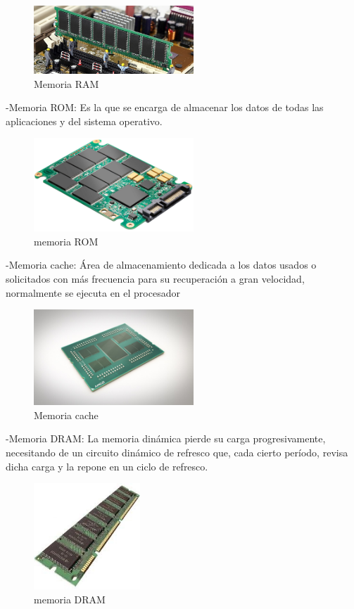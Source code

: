 \documentclass{article}
\begin{document}
\begin{figure}[h]
\includegraphics[width=6cm]{Memoria.jpg}
\centering
\caption{Memoria RAM}
\end{figure}

-Memoria ROM: Es la que se encarga de almacenar los datos de todas las aplicaciones y del sistema operativo.\newline

\begin{figure}[h]
\includegraphics[width=6cm]{ssd.jpg}
\centering
\caption{memoria ROM}
\end{figure}

-Memoria cache: Área de almacenamiento dedicada a los datos usados o solicitados con más frecuencia para su recuperación a gran velocidad, normalmente se ejecuta en el procesador \newline
\begin{figure}[h]
\includegraphics[width=6cm]{Cache.jpg}
\centering
\caption{Memoria cache}
\end{figure}

-Memoria DRAM: La memoria dinámica pierde su carga progresivamente, necesitando de un circuito dinámico de refresco que, cada cierto período, revisa dicha carga y la repone en un ciclo de refresco. \newline
\begin{figure}[h]
\includegraphics[width=4cm]{Dinamica.jpeg}
\centering
\caption{memoria DRAM}
\end{figure}
\end{document}
